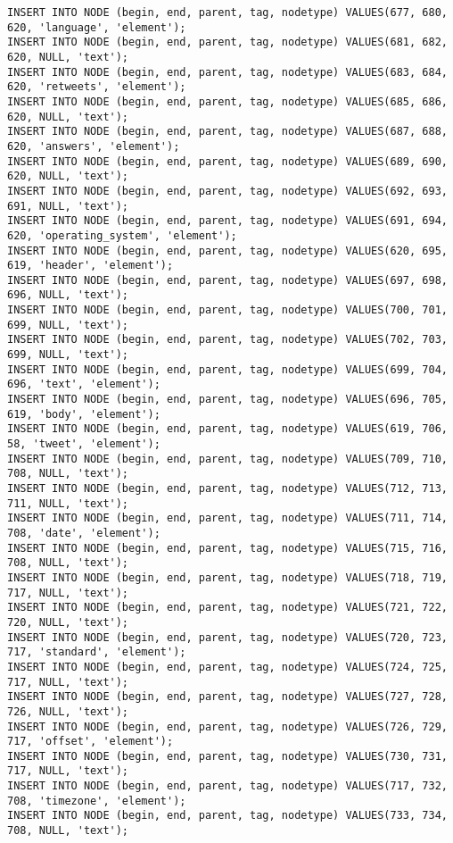 \begin{verbatim}
INSERT INTO NODE (begin, end, parent, tag, nodetype) VALUES(677, 680, 620, 'language', 'element');
INSERT INTO NODE (begin, end, parent, tag, nodetype) VALUES(681, 682, 620, NULL, 'text');
INSERT INTO NODE (begin, end, parent, tag, nodetype) VALUES(683, 684, 620, 'retweets', 'element');
INSERT INTO NODE (begin, end, parent, tag, nodetype) VALUES(685, 686, 620, NULL, 'text');
INSERT INTO NODE (begin, end, parent, tag, nodetype) VALUES(687, 688, 620, 'answers', 'element');
INSERT INTO NODE (begin, end, parent, tag, nodetype) VALUES(689, 690, 620, NULL, 'text');
INSERT INTO NODE (begin, end, parent, tag, nodetype) VALUES(692, 693, 691, NULL, 'text');
INSERT INTO NODE (begin, end, parent, tag, nodetype) VALUES(691, 694, 620, 'operating_system', 'element');
INSERT INTO NODE (begin, end, parent, tag, nodetype) VALUES(620, 695, 619, 'header', 'element');
INSERT INTO NODE (begin, end, parent, tag, nodetype) VALUES(697, 698, 696, NULL, 'text');
INSERT INTO NODE (begin, end, parent, tag, nodetype) VALUES(700, 701, 699, NULL, 'text');
INSERT INTO NODE (begin, end, parent, tag, nodetype) VALUES(702, 703, 699, NULL, 'text');
INSERT INTO NODE (begin, end, parent, tag, nodetype) VALUES(699, 704, 696, 'text', 'element');
INSERT INTO NODE (begin, end, parent, tag, nodetype) VALUES(696, 705, 619, 'body', 'element');
INSERT INTO NODE (begin, end, parent, tag, nodetype) VALUES(619, 706, 58, 'tweet', 'element');
INSERT INTO NODE (begin, end, parent, tag, nodetype) VALUES(709, 710, 708, NULL, 'text');
INSERT INTO NODE (begin, end, parent, tag, nodetype) VALUES(712, 713, 711, NULL, 'text');
INSERT INTO NODE (begin, end, parent, tag, nodetype) VALUES(711, 714, 708, 'date', 'element');
INSERT INTO NODE (begin, end, parent, tag, nodetype) VALUES(715, 716, 708, NULL, 'text');
INSERT INTO NODE (begin, end, parent, tag, nodetype) VALUES(718, 719, 717, NULL, 'text');
INSERT INTO NODE (begin, end, parent, tag, nodetype) VALUES(721, 722, 720, NULL, 'text');
INSERT INTO NODE (begin, end, parent, tag, nodetype) VALUES(720, 723, 717, 'standard', 'element');
INSERT INTO NODE (begin, end, parent, tag, nodetype) VALUES(724, 725, 717, NULL, 'text');
INSERT INTO NODE (begin, end, parent, tag, nodetype) VALUES(727, 728, 726, NULL, 'text');
INSERT INTO NODE (begin, end, parent, tag, nodetype) VALUES(726, 729, 717, 'offset', 'element');
INSERT INTO NODE (begin, end, parent, tag, nodetype) VALUES(730, 731, 717, NULL, 'text');
INSERT INTO NODE (begin, end, parent, tag, nodetype) VALUES(717, 732, 708, 'timezone', 'element');
INSERT INTO NODE (begin, end, parent, tag, nodetype) VALUES(733, 734, 708, NULL, 'text');

\end{verbatim}
